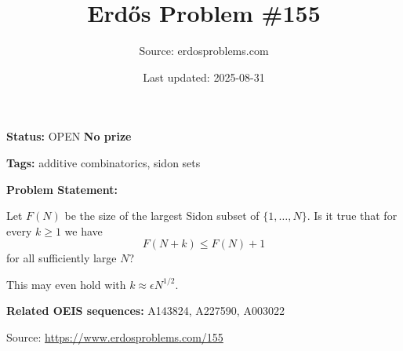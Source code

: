 \documentclass{article}
\title{Erd\H{o}s Problem \#155}
\date{Last updated: 2025-08-31}
\author{Source: erdosproblems.com}
\begin{document}
\maketitle

\noindent\textbf{Status:} OPEN \quad \textbf{No prize}

\noindent\textbf{Tags:} additive combinatorics, sidon sets

\medskip

\noindent\textbf{Problem Statement:}

Let $F(N)$ be the size of the largest Sidon subset of $\{1,\ldots,N\}$. Is it true that for every $k\geq 1$ we have\[F(N+k)\leq F(N)+1\]for all sufficiently large $N$?




This may even hold with $k\approx \epsilon N^{1/2}$.

\noindent\textbf{Related OEIS sequences:} A143824, A227590, A003022


\bigskip
\noindent\small{Source: \url{https://www.erdosproblems.com/155}}
\end{document}
